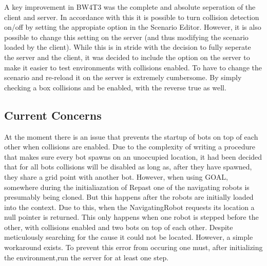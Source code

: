 A key improvement in BW4T3 was the complete and absolute seperation of the client and server. In accordance with this it is possible to turn collision detection on/off  by setting the appropiate option in the Scenario Editor. However, it is also possible to change this setting on the server (and thus modifying the scenario loaded by the client). While this is in stride with the decision to fully seperate the server and the client, it was decided to include the option on the server to make it easier to test environments with collisions enabled. To have to change the scenario and re-reload it on the server is extremely cumbersome. By simply checking a box collisions and be enabled, with the reverse true as well. 

\subsection*{Current Concerns}

At the moment there is an issue that prevents the startup of bots on top of each other when collisions are enabled. Due to the complexity of writing a procedure that makes sure every bot spawns on an unoccupied location, it had been decided that for all bots collisions will be disabled as long as, after they have spawned, they share a grid point with another bot. 
However, when using GOAL, somewhere during the initialiazation of Repast one of the navigating robots is presumably being cloned. But this happens after the robots are initially loaded into the context. Due to this, when the NavigatingRobot requests its location a null pointer is returned. This only happens when one robot is stepped before the other, with collisions enabled and two bots on top of each other. Despite meticulously searching for the cause it could not be located. However, a simple workaround exists. To prevent this error from occuring one must, after initializing the environment,run the server for at least one step.